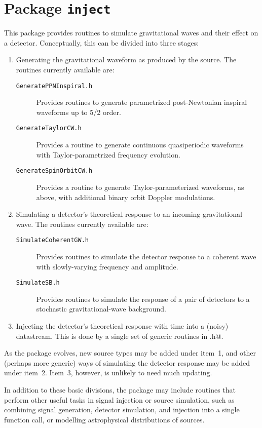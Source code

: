 \chapter{Package \texttt{inject}}

This package provides routines to simulate gravitational waves and
their effect on a detector.  Conceptually, this can be divided into
three stages:
\begin{enumerate}
\item Generating the gravitational waveform as produced by the source.
The routines currently available are:
\begin{description}
\item[\texttt{GeneratePPNInspiral.h}] Provides routines to generate
parametrized post-Newtonian inspiral waveforms up to 5/2 order.
\item[\texttt{GenerateTaylorCW.h}] Provides a routine to generate
continuous quasiperiodic waveforms with Taylor-parametrized frequency
evolution.
\item[\texttt{GenerateSpinOrbitCW.h}] Provides a routine to generate
Taylor-parameterized waveforms, as above, with additional binary orbit
Doppler modulations.
\end{description}

\item Simulating a detector's theoretical response to an incoming
gravitational wave.  The routines currently available are:
\begin{description}
\item[\texttt{SimulateCoherentGW.h}] Provides routines to simulate the
detector response to a coherent wave with slowly-varying frequency and
amplitude.
\item[\texttt{SimulateSB.h}] Provides routines to simulate the
  response of a pair of detectors to a stochastic gravitational-wave
  background.
\end{description}

\item Injecting the detector's theoretical response with time into a
(noisy) datastream.  This is done by a single set of generic routines
in \verb@Inject.h@.
\end{enumerate}

As the package evolves, new source types may be added under item~1,
and other (perhaps more generic) ways of simulating the detector
response may be added under item~2.  Item~3, however, is unlikely to
need much updating.

In addition to these basic divisions, the package may include routines
that perform other useful tasks in signal injection or source
simulation, such as combining signal generation, detector simulation,
and injection into a single function call, or modelling astrophysical
distributions of sources.

